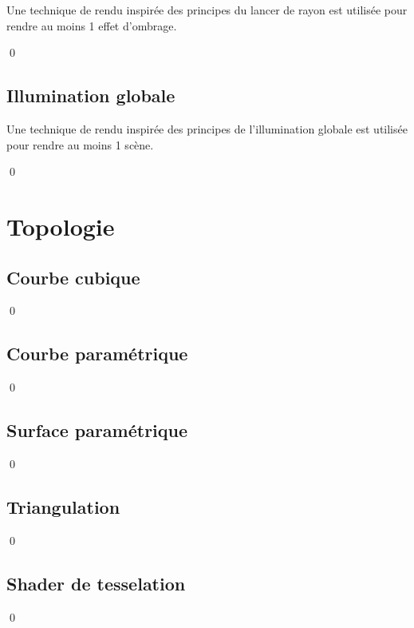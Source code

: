\documentclass[12pt]{article}
\newcommand{\state}{\noindent}
\begin{document}
\state
Une technique de rendu inspirée des principes du lancer de rayon est utilisée pour rendre au moins 1 effet d'ombrage.

\qed

\subsection{Illumination globale}

\state
Une technique de rendu inspirée des principes de l'illumination globale est utilisée pour rendre au moins 1 scène.

\qed

\pagebreak

\section{Topologie}

\subsection{Courbe cubique}

\state

\qed

\subsection{Courbe paramétrique}

\state

\qed

\subsection{Surface paramétrique}

\state

\qed

\subsection{Triangulation}

\state

\qed

\subsection{Shader de tesselation}

\state

\qed


\pagebreak
\end{document}
